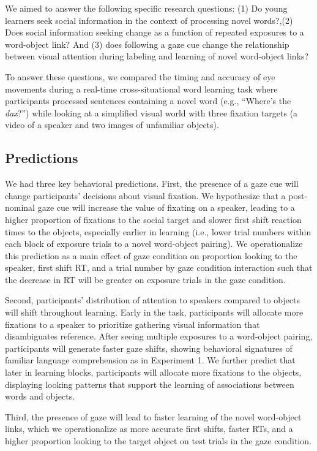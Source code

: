 \documentclass[10pt, letterpaper]{article}
\begin{document}
We aimed to answer the following specific research questions: (1) Do
young learners seek social information in the context of processing
novel words?,(2) Does social information seeking change as a function of
repeated exposures to a word-object link? And (3) does following a gaze
cue change the relationship between visual attention during labeling and
learning of novel word-object links?

To answer these questions, we compared the timing and accuracy of eye
movements during a real-time cross-situational word learning task where
participants processed sentences containing a novel word (e.g.,
``Where's the \emph{dax}?'') while looking at a simplified visual world
with three fixation targets (a video of a speaker and two images of
unfamiliar objects).

\hypertarget{predictions}{%
\subsection{Predictions}\label{predictions}}

We had three key behavioral predictions. First, the presence of a gaze
cue will change participants' decisions about visual fixation. We
hypothesize that a post-nominal gaze cue will increase the value of
fixating on a speaker, leading to a higher proportion of fixations to
the social target and slower first shift reaction times to the objects,
especially earlier in learning (i.e., lower trial numbers within each
block of exposure trials to a novel word-object pairing). We
operationalize this prediction as a main effect of gaze condition on
proportion looking to the speaker, first shift RT, and a trial number by
gaze condition interaction such that the decrease in RT will be greater
on exposure trials in the gaze condition.

Second, participants' distribution of attention to speakers compared to
objects will shift throughout learning. Early in the task, participants
will allocate more fixations to a speaker to prioritize gathering visual
information that disambiguates reference. After seeing multiple
exposures to a word-object pairing, participants will generate faster
gaze shifts, showing behavioral signatures of familiar language
comprehension as in Experiment 1. We further predict that later in
learning blocks, participants will allocate more fixations to the
objects, displaying looking patterns that support the learning of
associations between words and objects.

Third, the presence of gaze will lead to faster learning of the novel
word-object links, which we operationalize as more accurate first
shifts, faster RTs, and a higher proportion looking to the target object
on test trials in the gaze condition.
\end{document}

